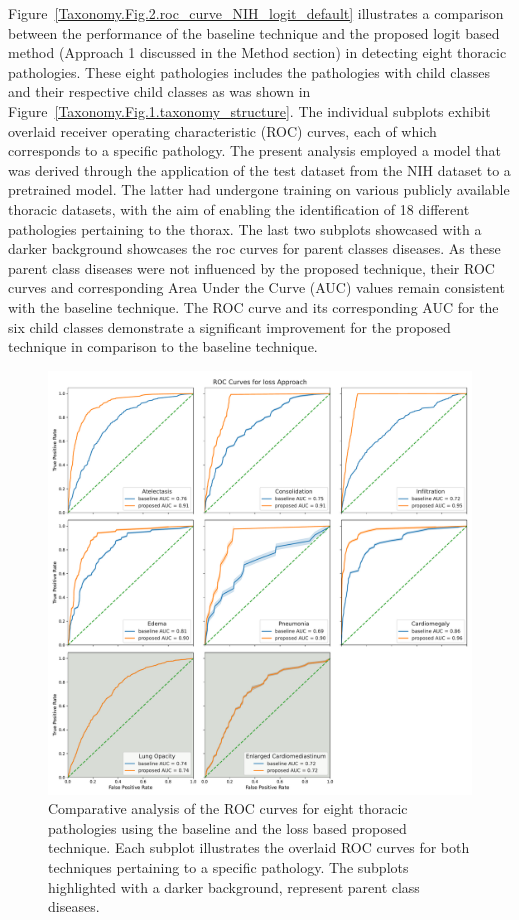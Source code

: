 \documentclass[preprint,3p,times, review]{elsarticle}
\begin{document}
Figure~\ref{Taxonomy.Fig.2.roc_curve_NIH_logit_default} illustrates a comparison between the performance of the baseline technique and the proposed logit based method (Approach 1 discussed in the Method section) in detecting eight thoracic pathologies. These eight pathologies includes the pathologies with child classes and their respective child classes as was shown in Figure~\ref{Taxonomy.Fig.1.taxonomy_structure}. The individual subplots exhibit overlaid receiver operating characteristic (ROC) curves, each of which corresponds to a specific pathology. The present analysis employed a model that was derived through the application of the test dataset from the NIH dataset to a pretrained model. The latter had undergone training on various publicly available thoracic datasets, with the aim of enabling the identification of 18 different pathologies pertaining to the thorax. The last two subplots showcased with a darker background showcases the roc curves for parent classes diseases. As these parent class diseases were not influenced by the proposed technique, their ROC curves and corresponding Area Under the Curve (AUC) values remain consistent with the baseline technique. The ROC curve and its corresponding AUC for the six child classes demonstrate a significant improvement for the proposed technique in comparison to the baseline technique.


\begin{figure}[htbp]
    \centering
    \includegraphics[width=\textwidth]{figures/roc_curve/default_NIH_loss/roc_curve_NIH_loss_default.pdf}
    \caption{Comparative analysis of the ROC curves for eight thoracic pathologies using the baseline and the loss based proposed technique. Each subplot illustrates the overlaid ROC curves for both techniques pertaining to a specific pathology. The subplots highlighted with a darker background, represent parent class diseases.}%
    \label{Taxonomy.Fig.3.roc_curve_NIH_loss_default}%
\end{figure}
\end{document}
